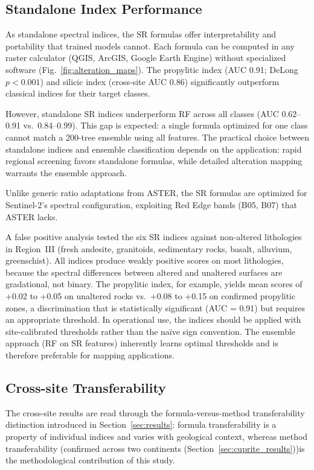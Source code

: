 \documentclass[preprint,authoryear,number]{elsarticle}
\begin{document}
\subsection{Standalone Index Performance}

As standalone spectral indices, the SR formulas offer interpretability and portability that trained models cannot. Each formula can be computed in any raster calculator (QGIS, ArcGIS, Google Earth Engine) without specialized software (Fig.~\ref{fig:alteration_maps}). The propylitic index (AUC 0.91; DeLong $p < 0.001$) and silicic index (cross-site AUC 0.86) significantly outperform classical indices for their target classes.

However, standalone SR indices underperform RF across all classes (AUC 0.62--0.91 vs.\ 0.84--0.99). This gap is expected: a single formula optimized for one class cannot match a 200-tree ensemble using all features. The practical choice between standalone indices and ensemble classification depends on the application: rapid regional screening favors standalone formulas, while detailed alteration mapping warrants the ensemble approach.

Unlike generic ratio adaptations from ASTER, the SR formulas are optimized for Sentinel-2's spectral configuration, exploiting Red Edge bands (B05, B07) that ASTER lacks.

A false positive analysis tested the six SR indices against non-altered lithologies in Region~III (fresh andesite, granitoids, sedimentary rocks, basalt, alluvium, greenschist). All indices produce weakly positive scores on most lithologies, because the spectral differences between altered and unaltered surfaces are gradational, not binary. The propylitic index, for example, yields mean scores of +0.02 to +0.05 on unaltered rocks vs.\ +0.08 to +0.15 on confirmed propylitic zones, a discrimination that is statistically significant (AUC = 0.91) but requires an appropriate threshold. In operational use, the indices should be applied with site-calibrated thresholds rather than the na\"ive sign convention. The ensemble approach (RF on SR features) inherently learns optimal thresholds and is therefore preferable for mapping applications.

\subsection{Cross-site Transferability}

The cross-site results are read through the formula-versus-method transferability distinction introduced in Section~\ref{sec:results}: formula transferability is a property of individual indices and varies with geological context, whereas method transferability (confirmed across two continents (Section~\ref{sec:cuprite_results}))is the methodological contribution of this study.
\end{document}
